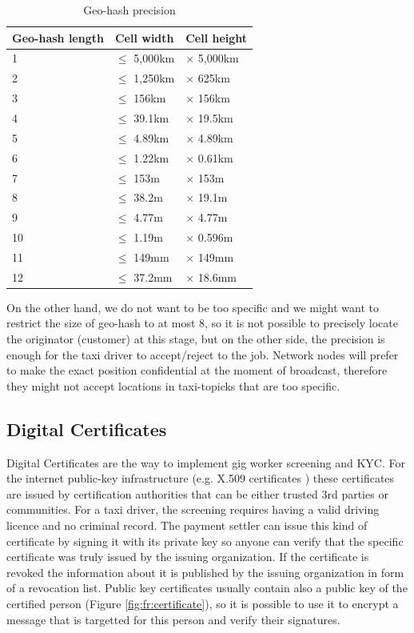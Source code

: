 \documentclass{article}
\begin{document}
\begin{table}
	\centering
	\begin{tabular}{lll}
		\toprule
		Geo-hash length & Cell width & Cell height \\
		\midrule
		1  & $\le$ 5,000km & $\times$ 5,000km \\
		2  & $\le$ 1,250km & $\times$ 625km   \\
		3  & $\le$ 156km   & $\times$ 156km   \\
		4  & $\le$ 39.1km  & $\times$ 19.5km  \\
		5  & $\le$ 4.89km  & $\times$ 4.89km  \\
		6  & $\le$ 1.22km  & $\times$ 0.61km  \\
		7  & $\le$ 153m    & $\times$ 153m    \\
		8  & $\le$ 38.2m   & $\times$ 19.1m   \\
		9  & $\le$ 4.77m   & $\times$ 4.77m   \\
		10 & $\le$ 1.19m   & $\times$ 0.596m  \\
		11 & $\le$ 149mm   & $\times$ 149mm   \\
		12 & $\le$ 37.2mm  & $\times$ 18.6mm  \\
		\bottomrule
	\end{tabular}
	\caption{Geo-hash precision}
	\label{tab:geoprec}
\end{table}

On the other hand, we do not want to be too specific and we might want to restrict the size of geo-hash to at most 8, so it is not possible to precisely locate the originator (customer) at this stage, but on the other side, the precision is enough for the taxi driver to accept/reject to the job.
Network nodes will prefer to make the exact position confidential at the moment of broadcast, therefore they might not accept locations in taxi-topicks that are too specific.

\subsection{Digital Certificates}
Digital Certificates are the way to implement gig worker screening and KYC. For the internet public-key infrastructure (e.g. X.509 certificates \cite{x509} ) these certificates are issued by certification authorities that can be either trusted 3rd parties or communities. For a taxi driver, the screening requires having a valid driving licence and no criminal record. The payment settler can issue this kind of certificate by signing it with its private key so anyone can verify that the specific certificate was truly issued by the issuing organization. If the certificate is revoked the information about it is published by the issuing organization in form of a revocation list. Public key certificates usually contain also a public key of the certified person (Figure \ref{fig:fr:certificate}), so it is possible to use it to encrypt a message that is targetted for this person and verify their signatures.
\end{document}
